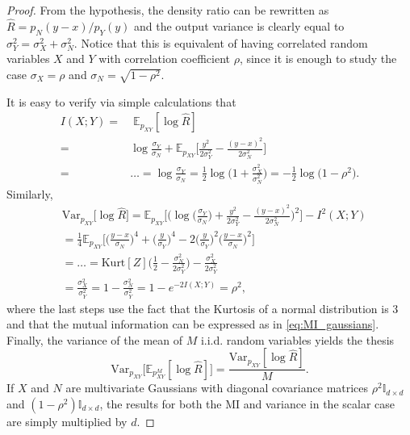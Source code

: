 \begin{proof}
From the hypothesis, the density ratio can be rewritten as $\hat{R} = p_N(y-x)/ p_Y(y)$ and the output variance is clearly equal to $\sigma_Y^2 = \sigma_X^2 + \sigma_N^2$. Notice that this is equivalent of having correlated random variables $X$ and $Y$ with correlation coefficient $\rho$, since it is enough to study the case $\sigma_X = \rho$ and $\sigma_N=\sqrt{1-\rho^2}$.

It is easy to verify via simple calculations that
\begin{align}
I(X;Y) = & \; \mathbb{E}_{p_{XY}} [\log \hat{R}] \nonumber \\
= & \log \frac{\sigma_Y}{\sigma_N} + \mathbb{E}_{p_{XY}}\biggl[ \frac{y^2}{2\sigma_Y^2} - \frac{(y-x)^2}{2\sigma_N^2}\biggr] \nonumber \\
= & \dots = \log \frac{\sigma_Y}{\sigma_N} = \frac{1}{2}\log\biggl(1+\frac{\sigma_X^2}{\sigma_N^2}\biggr)=-\frac{1}{2}\log\bigl(1-\rho^2\bigr).
\label{eq:MI_gaussians}
\end{align}
Similarly,
\begin{align}
& \text{Var}_{p_{XY}}\bigl[\log \hat{R} \bigr] = \mathbb{E}_{p_{XY}}\biggl[\biggl(\log\biggl(\frac{\sigma_Y}{\sigma_N}\biggl) +  \frac{y^2}{2\sigma_Y^2} - \frac{(y-x)^2}{2\sigma_N^2}\biggr)^2\biggr] - I^2(X;Y) \nonumber \\
& = \frac{1}{4}\mathbb{E}_{p_{XY}}\biggl[ \biggl(\frac{y-x}{\sigma_N}\biggr)^4 + \biggl(\frac{y}{\sigma_Y}\biggr)^4 -2 \biggl(\frac{y}{\sigma_Y}\biggr)^2 \biggl(\frac{y-x}{\sigma_N}\biggr)^2 \biggr] \nonumber \\
& = \dots = \text{Kurt}[Z]\biggl(\frac{1}{2}-\frac{\sigma_N^2}{2\sigma_Y^2}\biggr) - \frac{\sigma_X^2}{2\sigma_Y^2} \nonumber \\
& = \frac{\sigma_X^2}{\sigma_Y^2} = 1-\frac{\sigma_N^2}{\sigma_Y^2} = 1-e^{-2I(X;Y)}=\rho^2,
\end{align}
where the last steps use the fact that the Kurtosis of a normal distribution is $3$ and that the mutual information can be expressed as in \eqref{eq:MI_gaussians}. 
Finally, the variance of the mean of $M$ i.i.d. random variables yields the thesis
\begin{equation}
\text{Var}_{p_{XY}}\bigl[\mathbb{E}_{p^M_{XY}} [\log \hat{R}] \bigr]  =\frac{\text{Var}_{p_{XY}}[\log \hat{R}]}{M}. 
\end{equation}
If $X$ and $N$ are multivariate Gaussians with diagonal covariance matrices $\rho^2\mathbb{I}_{d\times d}$ and $(1-\rho^2) \mathbb{I}_{d\times d}$, the results for both the MI and variance in the scalar case are simply multiplied by $d$.
\end{proof}

